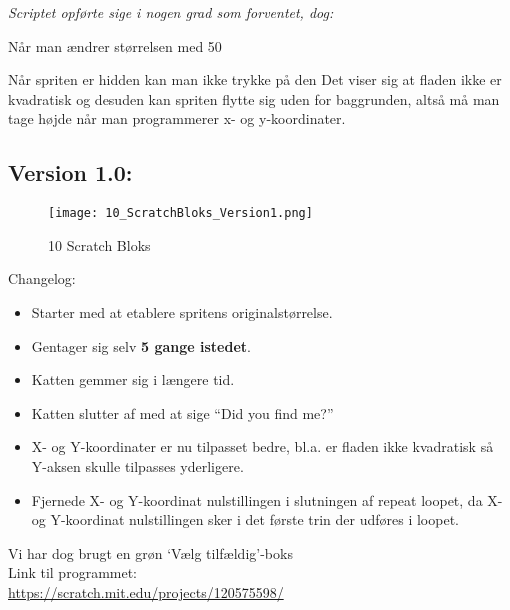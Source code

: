 \textit{Scriptet opførte sige i nogen grad som forventet, dog:}

Når man ændrer størrelsen med 50%

Når spriten er hidden kan man ikke trykke på den
Det viser sig at fladen ikke er kvadratisk og desuden kan spriten flytte sig uden for baggrunden, altså må man tage højde når man programmerer x- og y-koordinater.

\subsection{Version 1.0:}

\begin{figure}[ht]
	\centering
	\texttt{[image: 10\_ScratchBloks\_Version1.png]}
	\caption{{10 Scratch Bloks}}
	\label{fig:Version_1.0}
\end{figure}

Changelog:    

\begin{itemize}
	\item Starter med at etablere spritens originalstørrelse.
	\item Gentager sig selv \textbf{5 gange istedet}.
	\item Katten gemmer sig i længere tid.
	\item Katten slutter af med at sige “Did you find me?”
	\item X- og Y-koordinater er nu tilpasset bedre, bl.a. er fladen ikke kvadratisk så Y-aksen skulle tilpasses yderligere.
	\item Fjernede X- og Y-koordinat nulstillingen i slutningen af repeat loopet, da X- og Y-koordinat nulstillingen sker i det første trin der udføres i loopet. 
\end{itemize}


Vi har dog brugt en grøn ‘Vælg tilfældig’-boks\\

Link til programmet: \\
\url{https://scratch.mit.edu/projects/120575598/}



